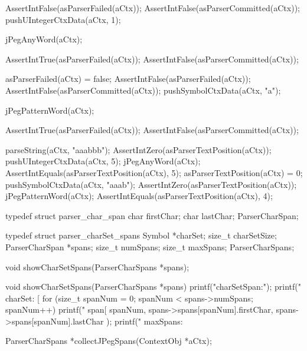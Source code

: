  AssertIntFalse(asParserFailed(aCtx));
  AssertIntFalse(asParserCommitted(aCtx));
  pushUIntegerCtxData(aCtx, 1);
  
  jPegAnyWord(aCtx);
  
  AssertIntTrue(asParserFailed(aCtx));
  AssertIntFalse(asParserCommitted(aCtx));
  
  asParserFailed(aCtx) = false;
  AssertIntFalse(asParserFailed(aCtx));
  AssertIntFalse(asParserCommitted(aCtx));
  pushSymbolCtxData(aCtx, "a");
  
  jPegPatternWord(aCtx);
  
  AssertIntTrue(asParserFailed(aCtx));
  AssertIntFalse(asParserCommitted(aCtx));
\stopCTest
\stopTestCase


\startCTest
  parseString(aCtx, "aaabbb");
  AssertIntZero(asParserTextPosition(aCtx));
  pushUIntegerCtxData(aCtx, 5);
  jPegAnyWord(aCtx);
  AssertIntEquals(asParserTextPosition(aCtx), 5);
  asParserTextPosition(aCtx) = 0;
  pushSymbolCtxData(aCtx, "aaab");
  AssertIntZero(asParserTextPosition(aCtx));
  jPegPatternWord(aCtx);
  AssertIntEquals(asParserTextPosition(aCtx), 4);
\stopCTest
\stopTestCase
\stopTestSuite


\startCHeader
typedef struct parser_char_span {
  char firstChar;
  char lastChar;
} ParserCharSpan;

typedef struct parser_charSet_spans {
  Symbol         *charSet;
  size_t          charSetSize;
  ParserCharSpan *spans;
  size_t          numSpans;
  size_t          maxSpans;
} ParserCharSpans;
\stopCHeader

\startCHeader
void showCharSetSpans(ParserCharSpans *spans);
\stopCHeader

\startCCode
void showCharSetSpans(ParserCharSpans *spans){
  printf("charSetSpan:\n");
  printf("  charSet: [%
  for (size_t spanNum = 0; spanNum < spans->numSpans; spanNum++) {
    printf("  span[%
      spanNum,
      spans->spans[spanNum].firstChar,
      spans->spans[spanNum].lastChar
    );
  }
  printf("  maxSpans: %
}
\stopCCode

\startCHeader
ParserCharSpans *collectJPegSpans(ContextObj *aCtx);
\stopCHeader

